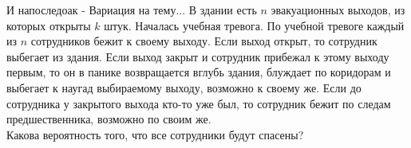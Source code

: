 \documentclass[pdftex,12pt,a4paper]{article}
\begin{document}
И напоследоак - Вариация на тему...
В здании есть $n$ эвакуационных выходов, из которых открыты $k$
штук. Началась учебная тревога. По учебной тревоге каждый из $n$
сотрудников бежит к своему выходу. Если выход открыт, то сотрудник
выбегает из здания. Если выход закрыт и сотрудник прибежал к этому
выходу первым, то он в панике возвращается вглубь здания, блуждает
по коридорам и выбегает к наугад выбираемому выходу, возможно к
своему же. Если до сотрудника у закрытого выхода кто-то уже был,
то сотрудник бежит по следам предшественника, возможно по своим же. \\
Какова вероятность того, что все сотрудники будут спасены? \\




















 
\end{document}
